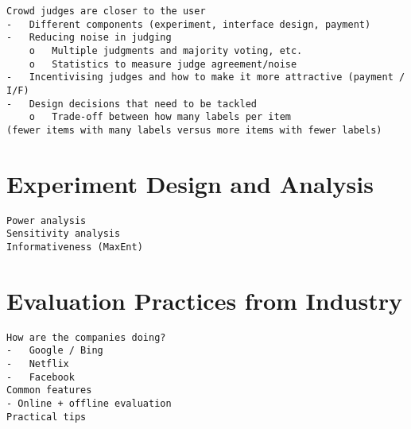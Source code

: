 \documentclass[openany]{now} %
\begin{document}
\begin{verbatim}
Crowd judges are closer to the user
-	Different components (experiment, interface design, payment)
-	Reducing noise in judging
	o	Multiple judgments and majority voting, etc.
	o	Statistics to measure judge agreement/noise
-	Incentivising judges and how to make it more attractive (payment / I/F)
-	Design decisions that need to be tackled
	o	Trade-off between how many labels per item 
(fewer items with many labels versus more items with fewer labels)
\end{verbatim}

\cite{Megorskaya2015} \cite{Davtyan2015}

\chapter{Experiment Design and Analysis}

\begin{verbatim}
Power analysis
Sensitivity analysis
Informativeness (MaxEnt)
\end{verbatim}

\chapter{Evaluation Practices from Industry}

\begin{verbatim}
How are the companies doing?
-	Google / Bing
-	Netflix
-	Facebook
Common features
- Online + offline evaluation
Practical tips

\end{verbatim}

\cite{Gomez-Uribe2015}

\backmatter  %



\end{document}
